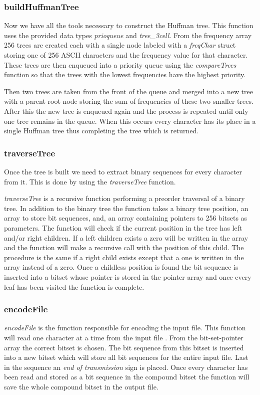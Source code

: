\documentclass[a4paper,11pt,twoside]{article}
\begin{document}
\subsubsection{buildHuffmanTree}
Now we have all the tools necessary to construct the Huffman tree. This function uses the provided data types \emph{prioqueue} and \emph{tree\_3cell}. From the frequency array 256 trees are created 
each with a single node labeled with a \emph{freqChar} struct storing one of 256 ASCII characters and the frequency value for that character. These trees are then enqueued into a priority queue using the \emph{compareTrees} function so that the trees with the lowest frequencies have the highest priority. 

Then two trees are taken from the front of the queue and merged into a new tree with a parent root node storing the sum of frequencies of these two smaller trees. After this the new tree is enqueued again and the process is repeated until only one tree remains in the queue. When this occurs every character has its place in a single Huffman tree thus completing the tree which is returned.

\subsubsection{traverseTree}
Once the tree is built we need to extract binary sequences for every character from it. This is done by using the \emph{traverseTree} function. 

\emph{traverseTree} is a recursive function performing a preorder traversal of a binary tree. In addition to the binary tree the function takes a binary tree position, an array to store bit sequences, and, an array containing pointers to 256 bitsets as parameters. The function will check if the current position in the tree has left and/or right children. If a left children exists a zero will be written in the array and the function will make a recursive call with the position of this child. The procedure is the same if a right child exists except that a one is written in the array instead of a zero. Once a childless position is found the bit sequence is inserted into a bitset whose pointer is stored in the pointer array and once every leaf has been visited the function is complete.

\subsubsection{encodeFile}
\emph{encodeFile} is the function responsible for encoding the input file. This function will read one character at a time from the input file . From the bit-set-pointer array the correct bitset is chosen. The bit sequence from this bitset is inserted into a new bitset which will store all bit sequences for the entire input file. Last in the sequence an \emph{end of transmission} sign is placed. Once every character has been read and stored as a bit sequence in the compound bitset the function will save the whole compound bitset in the output file.
\end{document}
